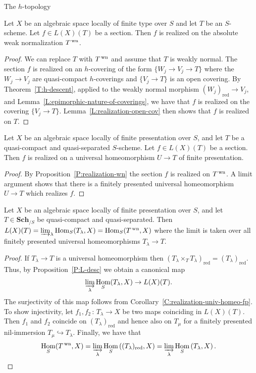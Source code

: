 \documentclass[a4paper,twoside,11pt]{amsart}[2009/07/02] %
\newcommand{\pref}[1]{\eqref{#1}}
\DeclareMathOperator{\Hom}{Hom}
\newcommand{\inj}{\hookrightarrow}
\newcommand{\map}[3]{#1\,:\, #2\rightarrow #3}
\newcommand{\Sch}{\mathbf{Sch}} %
\newcommand{\red}{\mathrm{red}}
\newcommand{\normcmd}[3]{%
#2%
\ifx\\#1\\%
^{\,\mathrm{#3}}%
\else%
^{#1/\mathrm{#3}}%
\fi%
}
\newcommand{\wn}[2]{\normcmd{#1}{#2}{wn}} %
\begin{document}
\begin{section}{The $h$-topology}
\begin{proposition}\label{P:realization-wn}
Let $X$ be an algebraic space locally of finite type over $S$ and let $T$ be an
$S$-scheme. Let $f\in L(X)(T)$ be a section. Then $f$ is realized on the
absolute weak normalization $\wn{}{T}$.
\end{proposition}
\begin{proof}
We can replace $T$ with $\wn{}{T}$ and assume that $T$ is weakly normal.
%
The section $f$ is realized on an $h$-covering of the form ${\{W_j\to V_j\to
T\}}$ where the $W_j\to V_j$ are quasi-compact $h$-coverings and $\{V_j\to T\}$
is an open covering. By Theorem~\pref{T:h-descent}, applied to the weakly
normal morphism $(W_j)_\red\to V_j$, and
Lemma~\pref{L:epimorphic-nature-of-coverings}, we have that $f$ is realized on
the covering $\{V_j\to T\}$.
%
Lemma~\pref{L:realization-open-cov} then shows that $f$ is realized on $T$.
\end{proof}

\begin{corollary}\label{C:realization-univ-homeo-fp}
Let $X$ be an algebraic space locally of finite presentation over $S$, and let
$T$ be a quasi-compact and quasi-separated $S$-scheme. Let $f\in L(X)(T)$ be a
section. Then $f$ is realized on a universal homeomorphism $U\to T$ of finite
presentation.
\end{corollary}
\begin{proof}
By Proposition~\pref{P:realization-wn} the section $f$ is realized on
$\wn{}{T}$. A limit argument shows that there is a finitely presented universal
homeomorphism $U\to T$ which realizes $f$.
\end{proof}

\begin{theorem}\label{T:htop-res}
Let $X$ be an algebraic space locally of finite presentation over $S$, and let
$T\in\Sch_{/S}$ be quasi-compact and quasi-separated. Then
$L(X)(T)=\varinjlim_\lambda \Hom_S(T_\lambda,X)=\Hom_S(\wn{}{T},X)$ where the
limit is taken over all finitely presented universal homeomorphisms
$T_\lambda\to T$.
\end{theorem}
\begin{proof}
If $T_\lambda\to T$ is a universal homeomorphism then $(T_\lambda\times_T
T_\lambda)_\red=(T_\lambda)_\red$. Thus, by Proposition~\pref{P:L-desc} we
obtain a canonical map
%
\begin{equation*}
\varinjlim_\lambda \Hom_S(T_\lambda,X)
\to L(X)(T).
\end{equation*}
%
The surjectivity of this map follows from Corollary~\pref{C:realization-univ-homeo-fp}.
%
To show injectivity, let $\map{f_1,f_2}{T_\lambda}{X}$ be two maps coinciding
in $L(X)(T)$. Then $f_1$ and $f_2$ coincide on $(T_\lambda)_\red$ and hence
also on $T_\mu$ for a finitely presented nil-immersion $T_\mu\inj
T_\lambda$. Finally, we have that
%
\begin{equation*}
\Hom_S(\wn{}{T},X)=\varinjlim_\lambda \Hom_S\left((T_\lambda)_\red,X\right)
=\varinjlim_\lambda \Hom_S\left(T_\lambda,X\right).\hfill\qedhere
\end{equation*}
%
\end{proof}


\end{section}
\end{document}
